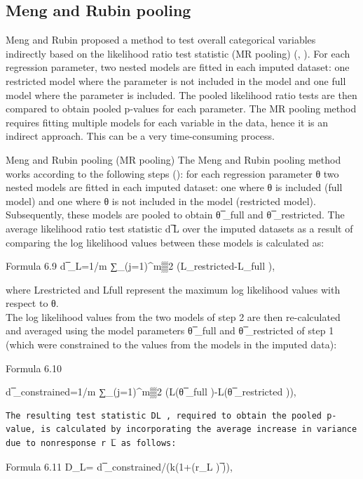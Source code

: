 \documentclass[]{book}
\begin{document}
\subsection{Meng and Rubin pooling}\label{meng-and-rubin-pooling}

Meng and Rubin proposed a method to test overall categorical variables
indirectly based on the likelihood ratio test statistic (MR pooling)
(\citet{Meng1992}, \citet{Mistler2013}). For each regression parameter,
two nested models are fitted in each imputed dataset: one restricted
model where the parameter is not included in the model and one full
model where the parameter is included. The pooled likelihood ratio tests
are then compared to obtain pooled p-values for each parameter. The MR
pooling method requires fitting multiple models for each variable in the
data, hence it is an indirect approach. This can be a very
time-consuming process.

Meng and Rubin pooling (MR pooling) The Meng and Rubin pooling method
works according to the following steps (\citet{Meng1992}): for each
regression parameter θ two nested models are fitted in each imputed
dataset: one where θ is included (full model) and one where θ is not
included in the model (restricted model). Subsequently, these models are
pooled to obtain θ ̅\_full and θ ̅\_restricted. The average likelihood
ratio test statistic d ̅L over the imputed datasets as a result of
comparing the log likelihood values between these models is calculated
as:

Formula 6.9 d ̅\_L=1/m ∑\_(j=1)\^{}m▒2 (L\_restricted-L\_full ),

where Lrestricted and Lfull represent the maximum log likelihood values
with respect to θ.\\
The log likelihood values from the two models of step 2 are then
re-calculated and averaged using the model parameters θ ̅\_full and θ
̅\_restricted of step 1 (which were constrained to the values from the
models in the imputed data):

Formula 6.10

d ̅\_constrained=1/m ∑\_(j=1)\^{}m▒2 (L(θ ̅\_full )-L(θ ̅\_restricted )),

\begin{verbatim}
The resulting test statistic DL , required to obtain the pooled p-value, is calculated by incorporating the average increase in variance due to nonresponse r ̅L as follows:
\end{verbatim}

Formula 6.11 D\_L= d ̅\_constrained/(k(1+(r\_L ) ̅)),
\end{document}
